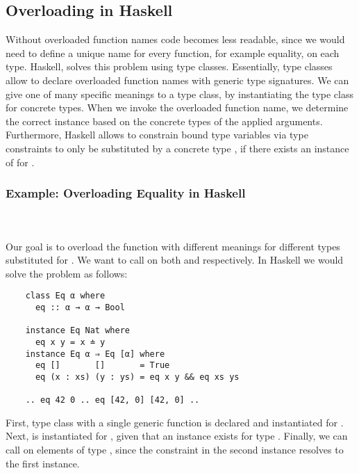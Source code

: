\subsection{Overloading in Haskell}
Without overloaded function names code becomes less readable, since we would need to define a unique name for every function, for example equality, on each type.
Haskell, solves this problem using type classes.
Essentially, type classes allow to declare overloaded function names with generic type signatures.
We can give one of many specific meanings to a type class, by instantiating the type class for concrete types.
When we invoke the overloaded function name, we determine the correct instance based on the concrete types of the applied arguments. 
Furthermore, Haskell allows to constrain bound type variables  via type constraints  to only be substituted by a concrete type , if there exists an instance of   for . 

\subsubsection{Example: Overloading Equality in Haskell}\hfill\\\\
Our goal is to overload the function  with different meanings for different types substituted for .
We want to call  on both  and \inl{[Nat]} respectively. 
In Haskell we would solve the problem as follows:
\begin{verbatim}
    class Eq α where
      eq :: α → α → Bool 

    instance Eq Nat where
      eq x y = x ≐ y
    instance Eq α ⇒ Eq [α] where
      eq []       []       = True
      eq (x : xs) (y : ys) = eq x y && eq xs ys 

    .. eq 42 0 .. eq [42, 0] [42, 0] ..
\end{verbatim}
First, type class  with a single generic function  is declared and instantiated for . 
Next,  is instantiated for \inl{[α]}, given that an instance  exists for type . 
Finally, we can call  on elements of type \inl{[Nat]}, since the constraint  in the second instance resolves to the first instance.

